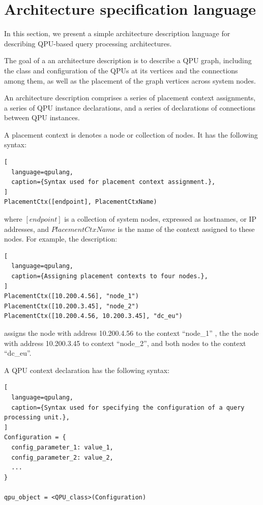 \section{Architecture specification language}
\label{sec:spec_language}
In this section, we present a simple architecture description language for describing QPU-based query processing architectures.

The goal of a an architecture description is to describe a QPU graph,
including the class and configuration of the QPUs at its vertices and the connections among them,
as well as the placement of the graph vertices across system nodes.

An architecture description comprises a series of placement context assignments,
a series of QPU instance declarations, and a series of declarations of connections between QPU instances.

A placement context is denotes a node or collection of nodes.
It has the following syntax:

\begin{lstlisting}[
  language=qpulang,
  caption={Syntax used for placement context assignment.},
]
PlacementCtx([endpoint], PlacementCtxName)
\end{lstlisting}

\noindent
where $[endpoint]$ is a collection of system nodes, expressed as hostnames, or IP addresses,
and $PlacementCtxName$ is the name of the context assigned to these nodes.
For example, the description:

\begin{lstlisting}[
  language=qpulang,
  caption={Assigning placement contexts to four nodes.},
]
PlacementCtx([10.200.4.56], "node_1")
PlacementCtx([10.200.3.45], "node_2")
PlacementCtx([10.200.4.56, 10.200.3.45], "dc_eu")
\end{lstlisting}

\noindent
assigns the node with address 10.200.4.56 to the context ``node\_1'' ,
the the node with address 10.200.3.45  to context ``node\_2'',
and both nodes to the context ``dc\_eu''.

\medskip
\noindent
A QPU context declaration has the following syntax:

\begin{lstlisting}[
  language=qpulang,
  caption={Syntax used for specifying the configuration of a query processing unit.},
]
Configuration = {
  config_parameter_1: value_1,
  config_parameter_2: value_2,
  ...
}

qpu_object = <QPU_class>(Configuration)
\end{lstlisting}

